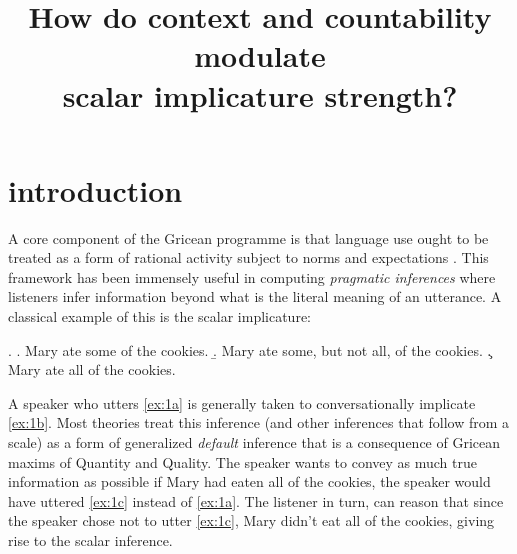 \documentclass[10pt, biblatex, linguex]{report}
\title[PHL394K Term Paper]{How do context and countability modulate\\
                                    scalar implicature strength?}
\author[Venkat]{
                \repauthor{
                    Venkata S Govindarajan \\
                    \institute{University of Texas at Austin} \\
                    \course{phl394k term paper}
                    }
                }
\begin{document}
\maketitle


%


\section{introduction}
\label{sec:introduction}

A core component of the Gricean programme is that language use ought to be
treated as a form of rational activity subject to norms and expectations
\citep{grice_logic_1975}. This
framework has been immensely useful in computing \textit{pragmatic inferences}
where listeners infer information beyond what is the literal meaning
of an utterance. A classical example of this is the scalar implicature:

\ex. \label{ex:1}\a. Mary ate some of the cookies.\label{ex:1a}
                 \b. Mary ate some, but not all, of the cookies.\label{ex:1b}
                 \c. Mary ate all of the cookies.\label{ex:1c}

A speaker who utters \ref{ex:1a} is generally taken to conversationally
implicate \ref{ex:1b}. Most theories treat this inference (and other inferences
that follow from a scale) as a form of generalized \textit{default} inference
that is a consequence of Gricean maxims of Quantity and Quality\citep{grice_logic_1975,
horn_towards_1984}. The speaker
wants to convey as much true information as possible \dash if Mary had eaten all
of the cookies, the speaker would have uttered \ref{ex:1c} instead of
\ref{ex:1a}. The listener in turn, can
reason that since the speaker chose not to utter \ref{ex:1c}, Mary didn't eat
all of the cookies, giving rise to the scalar inference.
\end{document}
